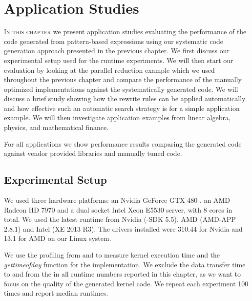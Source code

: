 
\chapter{Application Studies}
\label{ch:sixth} %
\label{chapter:codeGeneration-evaluation}
%
%

\lettrine[lines=3, loversize=0.1]{I}{n this chapter} we present application studies evaluating the performance of the \OpenCL code generated from pattern-based expressions using our systematic code generation approach presented in the previous chapter.
We first discuss our experimental setup used for the runtime experiments.
We will then start our evaluation by looking at the parallel reduction example which we used throughout the previous chapter and compare the performance of the manually optimized \OpenCL implementations against the systematically generated code.
We will discuss a brief study showing how the rewrite rules can be applied automatically and how effective such an automatic search strategy is for a simple application example.
We will then investigate application examples from linear algebra, physics, and mathematical finance.

For all applications we show performance results comparing the generated \OpenCL code against vendor provided libraries and manually tuned \OpenCL code.

\section{Experimental Setup}
We used three hardware platforms: an Nvidia GeForce GTX 480 \GPU, an AMD Radeon HD 7970 \GPU and a dual socket Intel Xeon E5530 server, with 8 cores in total.
We used the latest \OpenCL runtime from Nvidia (\CUDA-SDK 5.5), AMD (AMD-APP 2.8.1) and Intel (XE 2013 R3).
The \GPU drivers installed were 310.44 for Nvidia and 13.1 for AMD on our Linux system.

We use the profiling \APIs from \OpenCL and \CUDA to measure kernel execution time and the \textit{gettimeofday} function for the \CPU implementation.
We exclude the data transfer time to and from the \GPU in all runtime numbers reported in this chapter, as we want to focus on the quality of the generated \OpenCL kernel code.
We repeat each experiment 100 times and report median runtimes.




